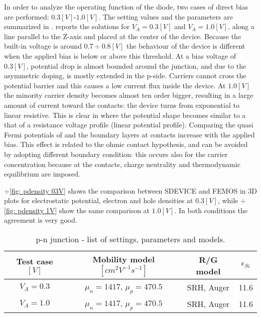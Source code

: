 In order to analyze the operating function of the diode, two cases of direct bias are performed: $0.3[V]$-$1.0[V]$. The setting values and the parameters are summarized in . 
 reports the solutions for $V_A=0.3[V]$ and $V_A=1.0[V]$, along a line parallel to the Z-axis and placed at the center of the device. 
Because the built-in voltage is around $0.7 \div 0.8 [V]$ the behaviour of the device is different when the applied bias is below or above this threshold. 
At a bias voltage of $0.3[V]$, potential drop is almost bounded around the junction, and due to the asymmetric doping, is mostly extended in the p-side. Carriers cannot cross the potential barrier and this causes a low current flux inside the device.
At $1.0[V]$ the minority carrier density becomes almost ten order bigger, resulting in a large amount of current toward the contacts:  the device turns from exponential to linear resistive. This is clear in  where the potential shape becomes similar to a that of a resistance voltage profile (linear potential profile). Comparing the quasi Fermi potentials of  and  the boundary layers at contacts increase with the applied bias. This effect is related to the ohmic contact hypothesis, and can be avoided by adopting different boundary condition: this occurs also for the carrier concentration because at the contacts, charge neutrality and thermodynamic equilibrium  are imposed.

$\div$\ref{fig: pdensity 03V} shows the comparison between SDEVICE and FEMOS in 3D plots for electrostatic potential, electron and hole densities at $0.3[V]$, while $\div$\ref{fig: pdensity 1V} show the same comparison at $1.0[V]$. In both conditions the agreement is very good.

\begin{table}[!h]
\centering
\begin{tabular}{cccc}
\toprule
 Test case $[V]$  & Mobility model $[cm^2V^{-1}s^{-1}]$  & R/G model & $\epsilon_{Si}$\\
\midrule
$V_A=0.3$ & $\mu_n = 1417$, $\mu_p = 470.5$ & SRH, Auger & 11.6 \\
$V_A=1.0$ & $\mu_n = 1417$, $\mu_p = 470.5$ & SRH, Auger & 11.6 \\\bottomrule
\end{tabular}
\caption{p-n junction - list of settings, parameters and models.}
\label{tab: diode direct}
\end{table}


